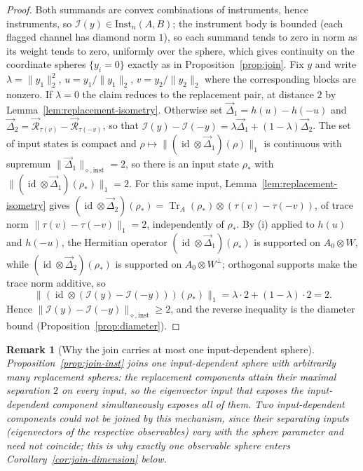 \documentclass[11pt,a4paper]{article}
\newtheorem{remark}[theorem]{Remark}
\newcommand{\Inst}{\mathrm{Inst}}
\newcommand{\Tr}{\operatorname{Tr}}
\newcommand{\id}{\operatorname{id}}
\newcommand{\vD}{\vec{\Delta}}
\begin{document}
\begin{proof}
Both summands are convex combinations of instruments, hence instruments, so $\mathcal I(y)\in\Inst_n(A,B)$; the instrument body is bounded (each flagged channel has diamond norm $1$), so each summand tends to zero in norm as its weight tends to zero, uniformly over the sphere, which gives continuity on the coordinate spheres $\{y_i=0\}$ exactly as in Proposition~\ref{prop:join}. Fix $y$ and write $\lambda=\|y_1\|_2^2$, $u=y_1/\|y_1\|_2$, $v=y_2/\|y_2\|_2$ where the corresponding blocks are nonzero. If $\lambda=0$ the claim reduces to the replacement pair, at distance $2$ by Lemma~\ref{lem:replacement-isometry}. Otherwise set $\vD_1=h(u)-h(-u)$ and $\vD_2=\vec{\mathcal R}_{\tau(v)}-\vec{\mathcal R}_{\tau(-v)}$, so that $\mathcal I(y)-\mathcal I(-y)=\lambda\vD_1+(1-\lambda)\vD_2$. The set of input states is compact and $\rho\mapsto\|(\id\otimes\vD_1)(\rho)\|_1$ is continuous with supremum $\|\vD_1\|_{\diamond,\mathrm{inst}}=2$, so there is an input state $\rho_*$ with $\|(\id\otimes\vD_1)(\rho_*)\|_1=2$. For this same input, Lemma~\ref{lem:replacement-isometry} gives $(\id\otimes\vD_2)(\rho_*)=\Tr_A(\rho_*)\otimes(\tau(v)-\tau(-v))$, of trace norm $\|\tau(v)-\tau(-v)\|_1=2$, independently of $\rho_*$. By (i) applied to $h(u)$ and $h(-u)$, the Hermitian operator $(\id\otimes\vD_1)(\rho_*)$ is supported on $A_0\otimes W$, while $(\id\otimes\vD_2)(\rho_*)$ is supported on $A_0\otimes W^{\perp}$; orthogonal supports make the trace norm additive, so
\[
\big\|(\id\otimes(\mathcal I(y)-\mathcal I(-y)))(\rho_*)\big\|_1
=\lambda\cdot2+(1-\lambda)\cdot2=2.
\]
Hence $\|\mathcal I(y)-\mathcal I(-y)\|_{\diamond,\mathrm{inst}}\ge2$, and the reverse inequality is the diameter bound (Proposition~\ref{prop:diameter}).
\end{proof}

\begin{remark}[Why the join carries at most one input-dependent sphere]
\label{rem:join-one-observable}
Proposition~\ref{prop:join-inst} joins one \emph{input-dependent} sphere with arbitrarily many replacement spheres: the replacement components attain their maximal separation $2$ on \emph{every} input, so the eigenvector input that exposes the input-dependent component simultaneously exposes all of them. Two input-dependent components could not be joined by this mechanism, since their separating inputs (eigenvectors of the respective observables) vary with the sphere parameter and need not coincide; this is why exactly one observable sphere enters Corollary~\ref{cor:join-dimension} below.
\end{remark}
\end{document}
